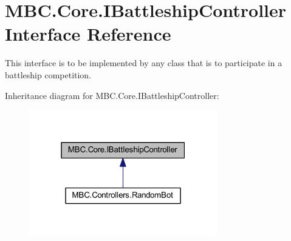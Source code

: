 \hypertarget{interface_m_b_c_1_1_core_1_1_i_battleship_controller}{\section{M\-B\-C.\-Core.\-I\-Battleship\-Controller Interface Reference}
\label{interface_m_b_c_1_1_core_1_1_i_battleship_controller}
}


This interface is to be implemented by any class that is to participate in a battleship competition.  




Inheritance diagram for M\-B\-C.\-Core.\-I\-Battleship\-Controller\-:
\nopagebreak
\begin{figure}[H]
\begin{center}
\leavevmode
\includegraphics[width=232pt]{interface_m_b_c_1_1_core_1_1_i_battleship_controller__inherit__graph}
\end{center}
\end{figure}
